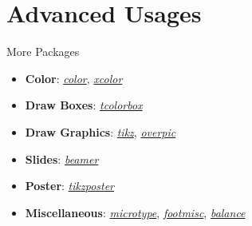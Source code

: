 \section{Advanced Usages}

\begin{frame}[fragile]{More Packages}
  \begin{itemize}
    \item \textbf{Color}: \href{http://texdoc.net/texmf-dist/doc/latex/graphics/color.pdf}{\emph{color}}, \href{http://texdoc.net/texmf-dist/doc/latex/xcolor/xcolor.pdf}{\emph{xcolor}}
          \begin{latexcode}
            \usepackage{color}
            \usepackage[table,dvipsnames]{xcolor}
          \end{latexcode}
    \item \textbf{Draw Boxes}: \href{http://texdoc.net/texmf-dist/doc/latex/tcolorbox/tcolorbox.pdf}{\emph{tcolorbox}}
    \item \textbf{Draw Graphics}: \href{http://texdoc.net/texmf-dist/doc/generic/pgf/pgfmanual.pdf}{\emph{tikz}}, \href{http://texdoc.net/texmf-dist/doc/latex/overpic/overpic.pdf}{\emph{overpic}}
    \item \textbf{Slides}: \href{http://texdoc.net/texmf-dist/doc/latex/beamer/beameruserguide.pdf}{\emph{beamer}}
    \item \textbf{Poster}: \href{http://texdoc.net/texmf-dist/doc/latex/tikzposter/tikzposter.pdf}{\emph{tikzposter}}
    \item \textbf{Miscellaneous}: \href{http://texdoc.net/texmf-dist/doc/latex/microtype/microtype.pdf}{\emph{microtype}}, \href{http://texdoc.net/texmf-dist/doc/latex/footmisc/footmisc.pdf}{\emph{footmisc}}, \href{http://texdoc.net/texmf-dist/doc/latex/preprint/balance.pdf}{\emph{balance}}
  \end{itemize}
\end{frame}

